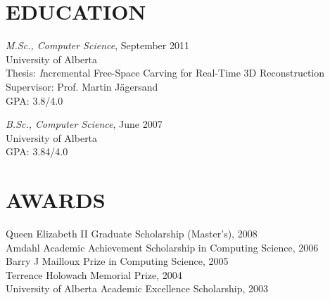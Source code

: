\documentclass{res}
\begin{document}
\begin{resume}
\clearpage
\section{EDUCATION}
    \vspace*{0.5ex}
    \textit{M.Sc., Computer Science}, September 2011\\
    University of Alberta\\
    \hspace*{2.5em} Thesis: {\textit Incremental Free-Space Carving for Real-Time 3D Reconstruction}\\
    \hspace*{2.5em} Supervisor: Prof. Martin J{\"a}gersand\\
    \hspace*{2.5em} GPA: 3.8/4.0

    \textit{B.Sc., Computer Science}, June 2007\\
    University of Alberta\\
    \hspace*{2.5em} GPA: 3.84/4.0


\section{AWARDS}
    \vspace*{0.5ex}
    Queen Elizabeth II Graduate Scholarship (Master's), 2008\\
    Amdahl Academic Achievement Scholarship in Computing Science, 2006\\
    Barry J Mailloux Prize in Computing Science, 2005\\
    Terrence Holowach Memorial Prize, 2004\\
    University of Alberta Academic Excellence Scholarship, 2003



\end{resume}
\end{document}
